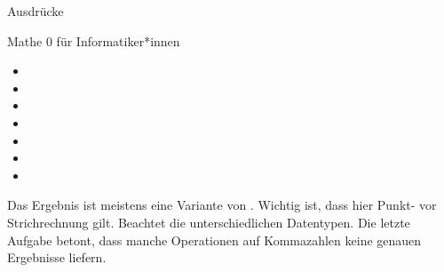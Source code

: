 \begin{task}[points=auto]{Ausdrücke }
\begin{subtask*}[points=0]{Mathe 0 für Informatiker*innen}
        \begin{multicols}{3}
            \begin{itemize}
                \item {}
                \item {}
                \item {}
                \item {}
                \item {}
                \item {}
                \item {}
            \end{itemize}
        \end{multicols}


        \begin{solution}
            Das Ergebnis ist meistens eine Variante von .
            Wichtig ist, dass hier Punkt- vor Strichrechnung gilt.
            Beachtet die unterschiedlichen Datentypen.
            Die letzte Aufgabe betont, dass manche Operationen auf Kommazahlen keine genauen Ergebnisse liefern.
        \end{solution}
    \end{subtask*}
\end{task}
